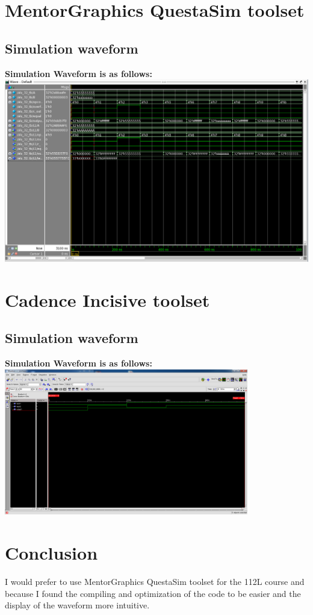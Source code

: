 \documentclass{article}
\begin{document}
\section{MentorGraphics QuestaSim toolset}
 
	\subsection{Simulation waveform}
	
	\bfseries{Simulation Waveform is as follows:} \\
	
	\includegraphics[width=0.8\columnwidth]{waveform_questasim.png}

\section{Cadence Incisive toolset}

	\subsection{Simulation waveform}

	\bfseries{Simulation Waveform is as follows:} \\

	\includegraphics[width=0.8\textwidth]{waveform_cadence.png}

\section{Conclusion}

	I would prefer to use MentorGraphics QuestaSim toolset for the 112L course and because I found the compiling and optimization of the code to be easier and the display of the waveform more intuitive.
\end{document}
